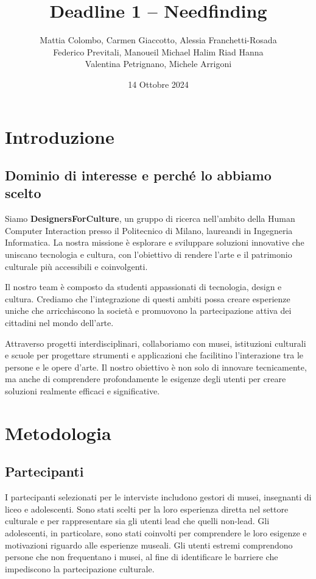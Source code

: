 \documentclass{article}
\title{Deadline 1 – Needfinding}
\author{Mattia Colombo, Carmen Giaccotto, Alessia Franchetti-Rosada \\Federico Previtali, Manoueil Michael Halim Riad Hanna \\ Valentina Petrignano, Michele Arrigoni}
\date{14 Ottobre 2024}
\begin{document}
\maketitle

\section{Introduzione}

\subsection{Dominio di interesse e perché lo abbiamo scelto}

Siamo \textbf{DesignersForCulture}, un gruppo di ricerca nell'ambito della Human Computer Interaction presso il Politecnico di Milano, laureandi in Ingegneria Informatica. La nostra missione è esplorare e sviluppare soluzioni innovative che uniscano tecnologia e cultura, con l'obiettivo di rendere l'arte e il patrimonio culturale più accessibili e coinvolgenti.

Il nostro team è composto da studenti appassionati di tecnologia, design e cultura. Crediamo che l'integrazione di questi ambiti possa creare esperienze uniche che arricchiscono la società e promuovono la partecipazione attiva dei cittadini nel mondo dell'arte.

Attraverso progetti interdisciplinari, collaboriamo con musei, istituzioni culturali e scuole per progettare strumenti e applicazioni che facilitino l'interazione tra le persone e le opere d'arte. Il nostro obiettivo è non solo di innovare tecnicamente, ma anche di comprendere profondamente le esigenze degli utenti per creare soluzioni realmente efficaci e significative.

\section{Metodologia}

\subsection{Partecipanti}

I partecipanti selezionati per le interviste includono gestori di musei, insegnanti di liceo e adolescenti. Sono stati scelti per la loro esperienza diretta nel settore culturale e per rappresentare sia gli utenti lead che quelli non-lead. Gli adolescenti, in particolare, sono stati coinvolti per comprendere le loro esigenze e motivazioni riguardo alle esperienze museali. Gli utenti estremi comprendono persone che non frequentano i musei, al fine di identificare le barriere che impediscono la partecipazione culturale.
\end{document}
